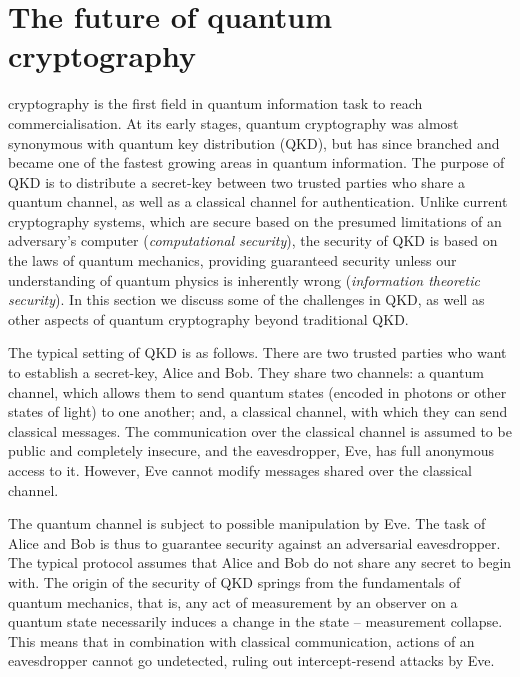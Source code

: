 \section{The future of quantum cryptography}\label{sec:essay_future_QKD}
 
 
\newline
 
 cryptography is the first field in quantum information task to reach commercialisation. At its early stages, quantum cryptography was almost synonymous with quantum key distribution (QKD), but has since branched and became one of the fastest growing areas in quantum information.
The purpose of QKD is to distribute a secret-key between two trusted parties who share a quantum channel, as well as a classical channel for authentication. Unlike current cryptography systems, which are secure based on the presumed limitations of an adversary's computer (\textit{computational security}), the security of QKD is based on the laws of quantum mechanics, providing guaranteed security unless our understanding of quantum physics is inherently wrong (\textit{information theoretic security}). In this section we discuss some of the challenges in QKD, as well as other aspects of quantum cryptography beyond traditional QKD.

The typical setting of QKD is as follows. There are two trusted parties who want to establish a secret-key, Alice and Bob. They share two channels: a quantum channel, which allows them to send quantum states (encoded in photons or other states of light) to one another; and, a classical channel, with which they can send classical messages. The communication over the classical channel is assumed to be public and completely insecure, and the eavesdropper, Eve, has full anonymous access to it. However, Eve cannot modify messages shared over the classical channel.

The quantum channel is subject to possible manipulation by Eve. The task of Alice and Bob is thus to guarantee security against an adversarial eavesdropper. The typical protocol assumes that Alice and Bob do not share any secret to begin with. The origin of the security of QKD springs from the fundamentals of quantum mechanics, that is, any act of measurement by an observer on a quantum state necessarily induces a change in the state -- measurement collapse. This means that in combination with classical communication, actions of an eavesdropper cannot go undetected, ruling out intercept-resend attacks by Eve.

